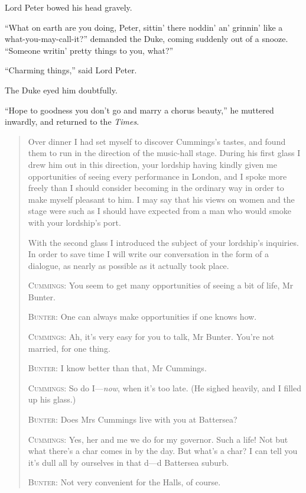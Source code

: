 Lord Peter bowed his head gravely.

\enquote{What on earth are you doing, Peter, sittin’ there noddin’ an’ grinnin’ like a what-you-may-call-it?} demanded the Duke, coming suddenly out of a snooze. \enquote{Someone writin’ pretty things to you, what?}

\enquote{Charming things,} said Lord Peter.

The Duke eyed him doubtfully.

\enquote{Hope to goodness you don’t go and marry a chorus beauty,} he muttered inwardly, and returned to the \textit{Times}.

\begin{quotation}
Over dinner I had set myself to discover Cummings’s tastes, and found them to run in the direction of the music-hall stage. During his first glass I drew him out in this direction, your lordship having kindly given me opportunities of seeing every performance in London, and I spoke more freely than I should consider becoming in the ordinary way in order to make myself pleasant to him. I may say that his views on women and the stage were such as I should have expected from a man who would smoke with your lordship’s port.

With the second glass I introduced the subject of your lordship’s inquiries. In order to save time I will write our conversation in the form of a dialogue, as nearly as possible as it actually took place.

\textsc{Cummings}: You seem to get many opportunities of seeing a bit of life, Mr Bunter.

\textsc{Bunter}: One can always make opportunities if one knows how.

\textsc{Cummings}: Ah, it’s very easy for you to talk, Mr Bunter. You’re not married, for one thing.

\textsc{Bunter}: I know better than that, Mr Cummings.

\textsc{Cummings}: So do I\allowbreak---\allowbreak \textit{now}, when it’s too late. (He sighed heavily, and I filled up his glass.)

\textsc{Bunter}: Does Mrs Cummings live with you at Battersea?

\textsc{Cummings}: Yes, her and me we do for my governor. Such a life! Not but what there’s a char comes in by the day. But what’s a char? I can tell you it’s dull all by ourselves in that d---d Battersea suburb.

\textsc{Bunter}: Not very convenient for the Halls, of course.


\end{quotation}
